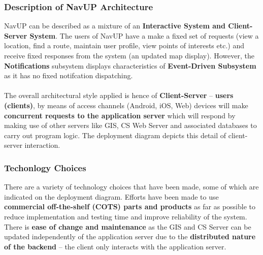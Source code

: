\documentclass[runningheads,a4paper]{article}
\begin{document}
\subsubsection{Description of NavUP Architecture}
\noindent NavUP can be described as a mixture of an \textbf{Interactive System and Client-Server System}. The users of NavUP have a make a fixed set of requests (view a location, find a route, maintain user profile, view points of interests etc.) and receive fixed responses from the system (an updated map display). However, the \textbf{Notifications} subsystem displays characteristics of \textbf{Event-Driven Subsystem} as it has no fixed notifcation dispatching.
\\ \\
The overall architectural style applied is hence of \textbf{Client-Server} – \textbf{users (clients)}, by means of access channels (Android, iOS, Web) devices will make \textbf{concurrent requests to the application server} which will respond by making use of other servers like GIS, CS Web Server and associated databases to carry out program logic. The deployment diagram depicts this detail of client-server interaction.

\subsubsection{Techonlogy Choices}
\noindent
There are a variety of technology choices that have been made, some of which are indicated on the deployment diagram. Efforts have been made to use \textbf{commercial off-the-shelf (COTS) parts and products} as far as possible to reduce implementation and testing time and improve reliability of the system. There is \textbf{ease of change and maintenance} as the GIS and CS Server can be updated independently of the application server due to the \textbf{distributed nature of the backend} – the client only interacts with the application server.
\end{document}
